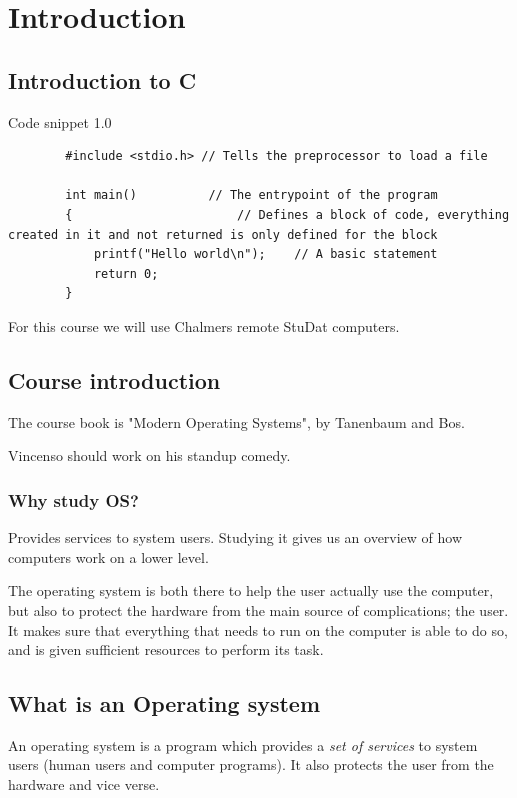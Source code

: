 \chapter{Introduction}
\section{Introduction to C}
\begin{snippet}{Code snippet 1.0}
	\begin{lstlisting}
		#include <stdio.h> // Tells the preprocessor to load a file

		int main() 			// The entrypoint of the program
		{						// Defines a block of code, everything created in it and not returned is only defined for the block
			printf("Hello world\n");	// A basic statement
			return 0;
		}
	\end{lstlisting}
\end{snippet}

For this course we will use Chalmers remote StuDat computers.

\section{Course introduction}

The course book is "Modern Operating Systems", by Tanenbaum and Bos.

Vincenso should work on his standup comedy.

\subsection{Why study OS?}

Provides services to system users. Studying it gives us an overview of how computers work on a lower level.

The operating system is both there to help the user actually use the computer, but also to protect the hardware from the main source of complications; the user. It makes sure that everything that needs to run on the computer is able to do so, and is given sufficient resources to perform its task.

\section{What is an Operating system}
An operating system is a program which provides a \textit{set of services} to system users (human users and computer programs). It also protects the user from the hardware and vice verse.


